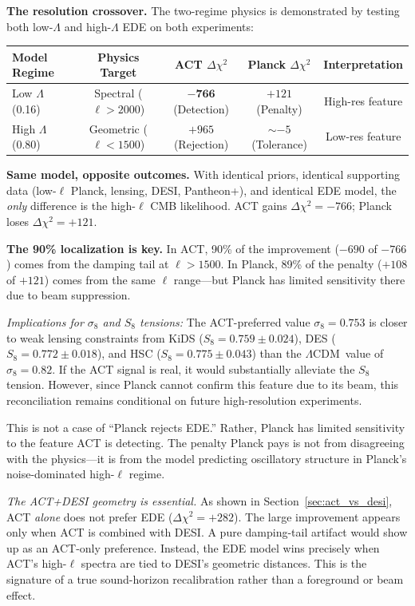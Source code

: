 \documentclass[twocolumn,showpacs,preprintnumbers,amsmath,amssymb,prd]{revtex4-2}
\newcommand{\lcdm}{$\Lambda$CDM}
\begin{document}
\textbf{The resolution crossover.} The two-regime physics is demonstrated by 
testing both low-$\Lambda$ and high-$\Lambda$ EDE on both experiments:
\begin{center}
\begin{tabular}{lcccc}
\toprule
Model Regime & Physics Target & ACT $\Delta\chi^2$ & Planck $\Delta\chi^2$ & Interpretation \\
\midrule
Low $\Lambda$ (0.16) & Spectral ($\ell > 2000$) & $\mathbf{-766}$ (Detection) & $+121$ (Penalty) & High-res feature \\
High $\Lambda$ (0.80) & Geometric ($\ell < 1500$) & $+965$ (Rejection) & $\sim -5$ (Tolerance) & Low-res feature \\
\bottomrule
\end{tabular}
\end{center}

\textbf{Same model, opposite outcomes.} With identical priors, identical 
supporting data (low-$\ell$ Planck, lensing, DESI, Pantheon+), and identical 
EDE model, the \emph{only} difference is the high-$\ell$ CMB likelihood. ACT 
gains $\Delta\chi^2 = -766$; Planck loses $\Delta\chi^2 = +121$.

\textbf{The 90\% localization is key.} In ACT, 90\% of the improvement ($-690$ 
of $-766$) comes from the damping tail at $\ell > 1500$. In Planck, 89\% of 
the penalty ($+108$ of $+121$) comes from the same $\ell$ range---but Planck 
has limited sensitivity there due to beam suppression.

\emph{Implications for $\sigma_8$ and $S_8$ tensions:} The ACT-preferred 
value $\sigma_8 = 0.753$ is closer to weak lensing constraints from 
KiDS ($S_8 = 0.759 \pm 0.024$), DES ($S_8 = 0.772 \pm 0.018$), and HSC 
($S_8 = 0.775 \pm 0.043$) than the \lcdm\ value of $\sigma_8 = 0.82$. 
If the ACT signal is real, it would substantially alleviate the $S_8$ 
tension. However, since Planck cannot confirm this feature due to its 
beam, this reconciliation remains conditional on future high-resolution 
experiments.

This is not a case of ``Planck rejects EDE.'' Rather, Planck has limited 
sensitivity to the feature ACT is detecting. The penalty Planck pays is not from 
disagreeing with the physics---it is from the model predicting oscillatory 
structure in Planck's noise-dominated high-$\ell$ regime.

\emph{The ACT+DESI geometry is essential.} As shown in Section~\ref{sec:act_vs_desi}, 
ACT \emph{alone} does not prefer EDE ($\Delta\chi^2 = +282$). The large improvement 
appears only when ACT is combined with DESI. A pure damping-tail artifact would 
show up as an ACT-only preference. Instead, the EDE model wins precisely when 
ACT's high-$\ell$ spectra are tied to DESI's geometric distances. This is the 
signature of a true sound-horizon recalibration rather than a foreground or 
beam effect.
\end{document}
